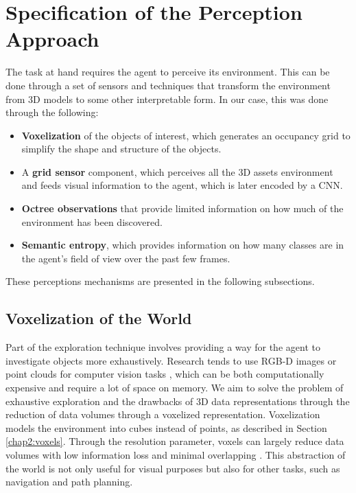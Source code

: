 \section{Specification of the Perception Approach}\label{chap:3:perception}
The task at hand requires the agent to perceive its environment. This can be done through a set of sensors and techniques that transform the environment from 3D models to some other interpretable form. In our case, this was done through the following:
\begin{itemize}
    \item \textbf{Voxelization} of the objects of interest, which generates an occupancy grid to simplify the shape and structure of the objects.
    \item A \textbf{grid sensor} component, which perceives all the 3D assets environment and feeds visual information to the agent, which is later encoded by a CNN.
    \item \textbf{Octree observations} that provide limited information on how much of the environment has been discovered.
    \item \textbf{Semantic entropy}, which provides information on how many classes are in the agent's field of view over the past few frames.
\end{itemize}
These perceptions mechanisms are presented in the following subsections.

\subsection{Voxelization of the World}
Part of the exploration technique involves providing a way for the agent to investigate objects more exhaustively. 
Research tends to use RGB-D images or point clouds for computer vision tasks \cite{xie2020linking, huang2021comprehensive}, which can be both computationally expensive and require a lot of space on memory.
We aim to solve the problem of exhaustive exploration and the drawbacks of 3D data representations through the reduction of data volumes through a voxelized representation. Voxelization models the environment into cubes instead of points, as described in Section \ref{chap2:voxels}. Through the resolution parameter, voxels can largely reduce data volumes with low information loss and minimal overlapping \cite{xie2020linking}. This abstraction of the world is not only useful for visual purposes but also for other tasks, such as navigation and path planning.


